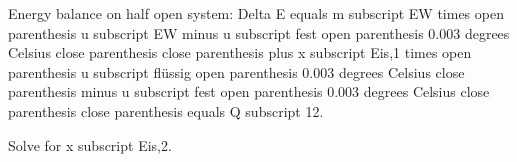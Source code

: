 Energy balance on half open system:  
Delta E equals m subscript EW times open parenthesis u subscript EW minus u subscript fest open parenthesis 0.003 degrees Celsius close parenthesis close parenthesis plus x subscript Eis,1 times open parenthesis u subscript flüssig open parenthesis 0.003 degrees Celsius close parenthesis minus u subscript fest open parenthesis 0.003 degrees Celsius close parenthesis close parenthesis equals Q subscript 12.  

Solve for x subscript Eis,2.
